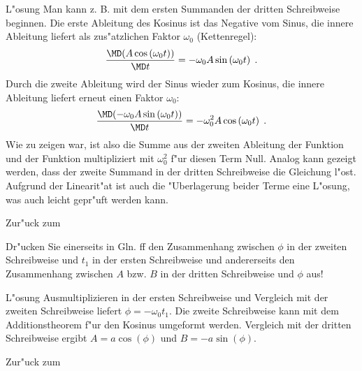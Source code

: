 \begin{MExercises}
\begin{MExercise}
\begin{MHint}{L"osung}
  Man kann z. B. mit dem ersten Summanden der dritten Schreibweise beginnen. Die erste Ableitung des Kosinus ist das Negative vom Sinus, die innere Ableitung liefert als zus"atzlichen Faktor $\omega_0$ (Kettenregel): 
  \begin{equation}
    \frac{\MD (A\cos\left(\omega_0t\right)) }{\MD t} = -\omega_0 A \sin\left(\omega_0t\right)\; .
  \end{equation}
  Durch die zweite Ableitung wird der Sinus wieder zum Kosinus, die innere Ableitung liefert erneut einen Faktor $\omega_0$:
  \begin{equation}
    \frac{\MD (-\omega_0 A \sin\left(\omega_0t\right)) }{\MD t} = -\omega_0^2 A \cos\left(\omega_0t\right)\; .
  \end{equation} 
  Wie zu zeigen war, ist also die Summe aus der zweiten Ableitung der Funktion und der Funktion multipliziert mit $\omega_0^2$ f"ur diesen Term Null. Analog kann gezeigt werden, dass der zweite Summand in der dritten Schreibweise die Gleichung l"ost. Aufgrund der Linearit"at ist auch die "Uberlagerung beider Terme eine L"osung, was auch leicht gepr"uft werden kann.
\end{MHint}

Zur"uck zum 
\end{MExercise}

\begin{MExercise}
Dr"ucken Sie einerseits in Gln. ff den Zusammenhang zwischen $\phi$ in der zweiten Schreibweise und $t_1$ in der ersten Schreibweise und andererseits den Zusammenhang zwischen $A$ bzw. $B$ in der dritten Schreibweise und $\phi$ aus!

\begin{MHint}{L"osung}
Ausmultiplizieren in der ersten Schreibweise und Vergleich mit der zweiten Schreibweise liefert $\phi = - \omega_0t_1$. Die zweite Schreibweise kann mit dem Additionstheorem f"ur den Kosinus umgeformt werden. Vergleich mit der dritten Schreibweise ergibt $A=a\cos\left(\phi\right)$ und $B=-a\sin\left(\phi\right)$.
\end{MHint}

Zur"uck zum 
\end{MExercise}


\end{MExercises}
